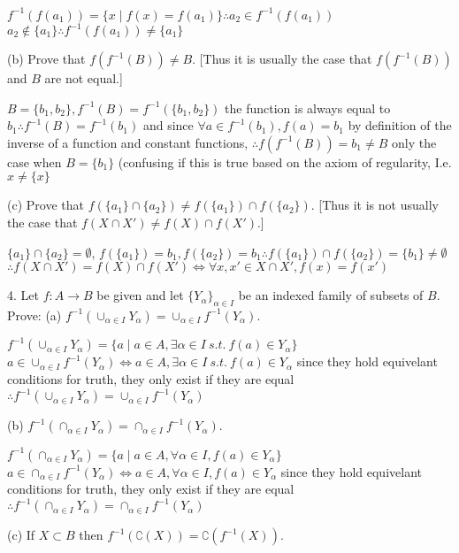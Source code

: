 $f^{-1}(f(a_{1})) = \{ x \mid f(x) = f(a_{1})\} \therefore a_{2} \in f^{-1}(f(a_{1}))$
$a_{2} \not \in \{ a_{1}\} \therefore f^{-1}(f(a_{1})) \not = \{a_{1}\}$

(b) Prove that $f(f^{-1}(B)) \not = B$. [Thus it is usually the case that $f(f^{-1}(B))$ and $B$ are not equal.]

$B = \{ b_{1}, b_{2}\}, f^{-1}(B) = f^{-1}(\{ b_{1}, b_{2}\}) $ the function is always equal  to $b_{1} \therefore f^{-1}(B) = f^{-1}(b_{1})$
and since $\forall a \in f^{-1}(b_{1}), f(a) = b_{1}$ by definition of the inverse of a function and constant functions,
$\therefore f(f^{-1}(B)) = b_{1} \not = B$ only the  case when $B = \{ b_{1}\}$ (confusing if this is true based on the axiom of regularity, I.e. $x \not = \{ x \}$

(c) Prove that $f(\{a_{1}\} \cap \{ a_{2}\} ) \not = f(\{a_{1}\}) \cap f(\{ a_{2}\})$. [Thus it is not usually the case that $f(X \cap X') \not = f(X) \cap f(X')$.]

$\{ a_{1}\} \cap \{a_{2}\} = \emptyset$, $f(\{ a_{1}\} ) = b_{1}, f(\{a_{2}\}) = b_{1} \therefore f(\{a_{1}\}) \cap f(\{ a_{2}\}) = \{b_{1}\} \not =  \emptyset$
$\therefore f(X \cap X') = f(X) \cap f(X') \iff \forall x, x' \in X \cap X', f(x) = f(x')$

4. Let $f: A \rightarrow B$ be given and let $\{ Y_{\alpha}\}_{\alpha \in I}$ be an indexed family of subsets of $B$. Prove:
(a) $f^{-1}(\cup_{\alpha \in I}Y_{\alpha}) = \cup_{\alpha \in I} f^{-1}(Y_{\alpha}) $.

$f^{-1}(\cup_{\alpha \in I} Y_{\alpha}) = \{a \mid a \in A, \exists\alpha \in I\ s.t.\  f(a) \in Y_{\alpha} \}$ 
$a \in \cup_{\alpha \in I} f^{-1}(Y_{\alpha}) \iff a \in A, \exists\alpha \in I\ s.t.\  f(a) \in Y_{\alpha} $
since they hold equivelant conditions for truth, they only exist if they are equal
$\therefore f^{-1}(\cup_{\alpha \in I}Y_{\alpha}) = \cup_{\alpha \in I} f^{-1}(Y_{\alpha})$

(b) $f^{-1}(\cap_{\alpha \in I}Y_{\alpha}) = \cap_{\alpha \in I} f^{-1}(Y_{\alpha}) $.


$f^{-1}(\cap_{\alpha \in I} Y_{\alpha}) = \{a \mid a \in A, \forall\alpha \in I, f(a) \in Y_{\alpha} \}$ 
$a \in \cap_{\alpha \in I} f^{-1}(Y_{\alpha}) \iff a \in A, \forall\alpha \in I, f(a) \in Y_{\alpha} $
since they hold equivelant conditions for truth, they only exist if they are equal
$\therefore f^{-1}(\cap_{\alpha \in I}Y_{\alpha}) = \cap_{\alpha \in I} f^{-1}(Y_{\alpha})$

(c) If $X \subset B$ then $f^{-1}(\complement(X)) = \complement(f^{-1}(X))$.


